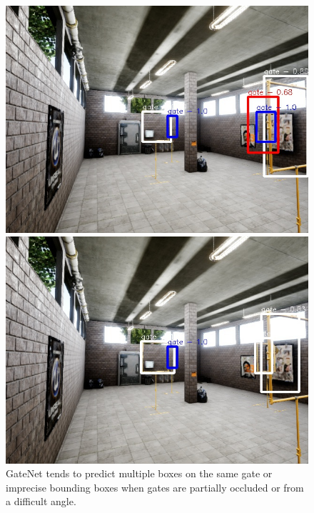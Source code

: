 \documentclass{article}
\begin{document}
\begin{figure}
	\begin{minipage}{0.3\linewidth}
	\includegraphics[width=\linewidth]{fig/gate_comp4}
	\end{minipage}
	\begin{minipage}{0.3\linewidth}
	\includegraphics[width=\linewidth]{fig/v2_comp4}
	\end{minipage}
	\caption{GateNet tends to predict multiple boxes on the same gate or imprecise bounding boxes when gates are partially occluded or from a difficult angle.}


\end{figure}
\end{document}
